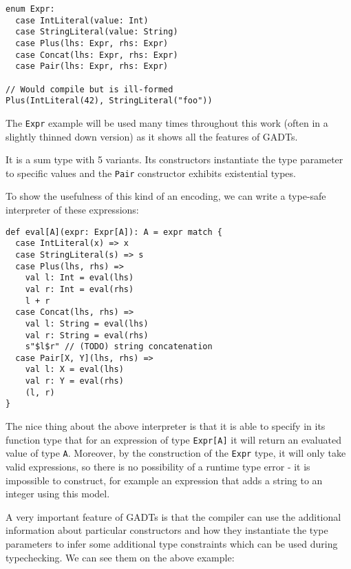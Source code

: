 \begin{verbatim}
enum Expr:
  case IntLiteral(value: Int)
  case StringLiteral(value: String)
  case Plus(lhs: Expr, rhs: Expr)
  case Concat(lhs: Expr, rhs: Expr)
  case Pair(lhs: Expr, rhs: Expr)
  
// Would compile but is ill-formed
Plus(IntLiteral(42), StringLiteral("foo"))
\end{verbatim}

The \texttt{Expr} example will be used many times throughout this work (often in a slightly thinned down version) as it shows all the features of GADTs.

It is a sum type with 5 variants. Its constructors instantiate the type parameter to specific values and the \texttt{Pair} constructor exhibits existential types.

To show the usefulness of this kind of an encoding, we can write a type-safe interpreter of these expressions:

\begin{verbatim}
def eval[A](expr: Expr[A]): A = expr match {
  case IntLiteral(x) => x
  case StringLiteral(s) => s
  case Plus(lhs, rhs) => 
    val l: Int = eval(lhs)
    val r: Int = eval(rhs)
    l + r
  case Concat(lhs, rhs) =>
    val l: String = eval(lhs)
    val r: String = eval(rhs)
    s"$l$r" // (TODO) string concatenation
  case Pair[X, Y](lhs, rhs) =>
    val l: X = eval(lhs)
    val r: Y = eval(rhs)
    (l, r)
}
\end{verbatim}

The nice thing about the above interpreter is that it is able to specify in its function type that for an expression of type \texttt{Expr[A]} it will return an evaluated value of type \texttt{A}. Moreover, by the construction of the \texttt{Expr} type, it will only take valid expressions, so there is no possibility of a runtime type error - it is impossible to construct, for example an expression that adds a string to an integer using this model.

A very important feature of GADTs is that the compiler can use the additional information about particular constructors and how they instantiate the type parameters to infer some additional type constraints which can be used during typechecking. We can see them on the above example:

